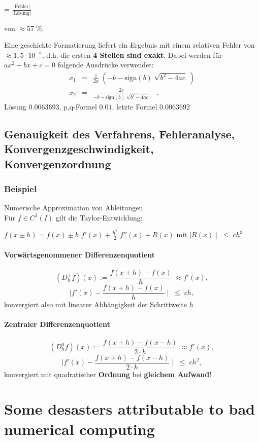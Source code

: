\documentclass[ngerman,fontsize=11pt, paper=a4, parskip=half, titlepage=true, toc=bib]{scrbook}
\theoremstyle{definition}
\theoremstyle{plain}
\begin{document}
{ = $\frac{|\mbox{Fehler}|}{|\mbox{Lösung}|}$}

von        $\approx 57 \; \%$.

Eine geschickte Formatierung liefert ein Ergebnis mit einem
relativen Fehler von $\approx 1,5 \cdot 10^{-5}$,
d.h. die ersten \textbf{4 Stellen sind exakt}. 
Dabei werden für $ax^2 + bx + c = 0$ folgende Ausdrücke verwendet:
\begin{align*}
  x_1 &=& \tfrac{1}{2a} \; (- b - \mbox{sign}(b) \; \sqrt{b^2 -
          4ac}\;)\\
  x_2& =  &\tfrac{2c}{- b - \mbox{sign}(b) \; \sqrt{b^2 - 4ac}} \quad .
\end{align*}
Lösung $0.0063693$, p,q-Formel $0.01$,
letzte Formel $0.0063692$

\subsection*{Genauigkeit des Verfahrens, Fehleranalyse,
  Konvergenzgeschwindigkeit, Konvergenzordnung}

\subsubsection{Beispiel}
Numerische Approximation von Ableitungen \\
Für $f \in C^3(I)$ gilt die Taylor-Entwicklung:

$f(x \pm h) = f(x) \pm h \; f'(x) + \frac{h^2}{2} \; f''(x) +
R(x)$ mit $\mid R(x) \mid \; \leq \; c   h^3$

\paragraph{Vorwärtsgenommener Differenzenquotient}
$$ (D_h^+f)(x):= \frac{f(x + h) - f(x)}{h} \; \approx f'(x), $$
$$\mid f'(x) - \frac{f(x + h) - f(x)}{h} \mid \; \leq \; c h, $$
konvergiert also mit linearer Abhängigkeit der
Schrittweite $h$  
\paragraph{Zentraler Differenzenquotient}
$$(D_h^0f) (x):= \frac{f(x + h) - f(x-h)}{2 \cdot h} \; \approx
f'(x),$$
$$\mid f'(x) - \frac{f(x + h) - f(x - h)}{2 \cdot h} \mid \;
\leq \; c h^2, $$
konvergiert mit quadratischer \textbf{Ordnung} bei
\textbf{gleichem Aufwand}!


\section*{Some desasters attributable to bad numerical computing}
\end{document}
